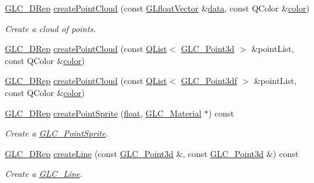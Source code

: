 \begin{DoxyCompactItemize}
\item 
\hyperlink{class_g_l_c__3_d_rep}{G\-L\-C\-\_\-D\-Rep} \hyperlink{class_g_l_c___factory_acdec9eb4a27e8a084d9875e3da36cd81}{create\-Point\-Cloud} (const \hyperlink{glc__global_8h_a9f3f0b00cd127b066c9931b9c257a046}{G\-Lfloat\-Vector} \&\hyperlink{glext_8h_a8850df0785e6fbcc2351af3b686b8c7a}{data}, const Q\-Color \&\hyperlink{glext_8h_a3ea846f998d64f079b86052b6c4193a8}{color})
\begin{DoxyCompactList}\small\item\em Create a cloud of points. \end{DoxyCompactList}\item 
\hyperlink{class_g_l_c__3_d_rep}{G\-L\-C\-\_\-D\-Rep} \hyperlink{class_g_l_c___factory_acb79ec733b678ab7a4f99a4649b6fcbe}{create\-Point\-Cloud} (const \hyperlink{class_q_list}{Q\-List}$<$ \hyperlink{glc__vector3d_8h_a4e13a9bbc7ab3d34de7e98b41836772c}{G\-L\-C\-\_\-\-Point3d} $>$ \&point\-List, const Q\-Color \&\hyperlink{glext_8h_a3ea846f998d64f079b86052b6c4193a8}{color})
\item 
\hyperlink{class_g_l_c__3_d_rep}{G\-L\-C\-\_\-D\-Rep} \hyperlink{class_g_l_c___factory_ae8c50398df0bba36a457557924422680}{create\-Point\-Cloud} (const \hyperlink{class_q_list}{Q\-List}$<$ \hyperlink{glc__vector3df_8h_a433841665e7ab0e1f29a0c68ce0d1cc7}{G\-L\-C\-\_\-\-Point3df} $>$ \&point\-List, const Q\-Color \&\hyperlink{glext_8h_a3ea846f998d64f079b86052b6c4193a8}{color})
\item 
\hyperlink{class_g_l_c__3_d_rep}{G\-L\-C\-\_\-D\-Rep} \hyperlink{class_g_l_c___factory_a0f9f76a4f414255e4c772e71438f10ff}{create\-Point\-Sprite} (\hyperlink{_super_l_u_support_8h_a6a1bb6ed41f44b60e7bd83b0e9945aa7}{float}, \hyperlink{class_g_l_c___material}{G\-L\-C\-\_\-\-Material} $\ast$) const 
\begin{DoxyCompactList}\small\item\em Create a \hyperlink{class_g_l_c___point_sprite}{G\-L\-C\-\_\-\-Point\-Sprite}. \end{DoxyCompactList}\item 
\hyperlink{class_g_l_c__3_d_rep}{G\-L\-C\-\_\-D\-Rep} \hyperlink{class_g_l_c___factory_a0b26a346960478290925decfdf1b1d36}{create\-Line} (const \hyperlink{glc__vector3d_8h_a4e13a9bbc7ab3d34de7e98b41836772c}{G\-L\-C\-\_\-\-Point3d} \&, const \hyperlink{glc__vector3d_8h_a4e13a9bbc7ab3d34de7e98b41836772c}{G\-L\-C\-\_\-\-Point3d} \&) const 
\begin{DoxyCompactList}\small\item\em Create a \hyperlink{class_g_l_c___line}{G\-L\-C\-\_\-\-Line}. \end{DoxyCompactList}\item 

\end{DoxyCompactItemize}
